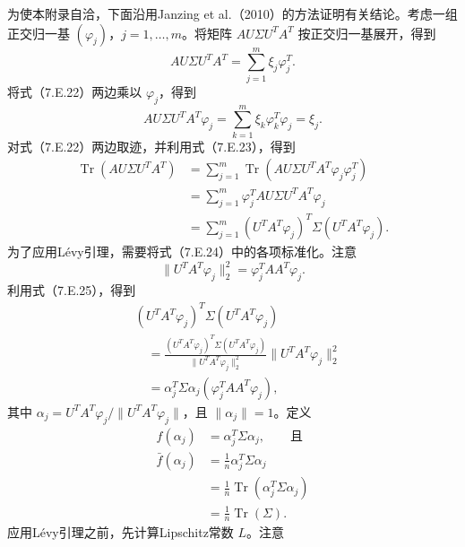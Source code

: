 为使本附录自洽，下面沿用Janzing et al.（2010）的方法证明有关结论。考虑一组正交归一基 $(\varphi_j)$，$j=1,\ldots,m$。将矩阵 $AU\Sigma U^TA^T$ 按正交归一基展开，得到
\begin{equation}
AU\Sigma U^TA^T=\sum_{j=1}^m\xi_j\varphi_j^T.\tag{7.E.22}
\end{equation}
将式（7.E.22）两边乘以 $\varphi_j$，得到
\begin{equation}
AU\Sigma U^TA^T\varphi_j=\sum_{k=1}^m\xi_k\varphi_k^T\varphi_j=\xi_j.\tag{7.E.23}
\end{equation}
对式（7.E.22）两边取迹，并利用式（7.E.23），得到
\begin{equation}
\begin{aligned}
\operatorname{Tr}(AU\Sigma U^TA^T)
 &=\sum_{j=1}^m\operatorname{Tr}(AU\Sigma U^TA^T\varphi_j\varphi_j^T)\\
 &=\sum_{j=1}^m\varphi_j^TAU\Sigma U^TA^T\varphi_j\\
 &=\sum_{j=1}^m(U^TA^T\varphi_j)^T\Sigma(U^TA^T\varphi_j).
\end{aligned}\tag{7.E.24}
\end{equation}
为了应用Lévy引理，需要将式（7.E.24）中的各项标准化。注意
\begin{equation}
\|U^TA^T\varphi_j\|_2^2=\varphi_j^TAA^T\varphi_j.\tag{7.E.25}
\end{equation}
利用式（7.E.25），得到
\begin{equation}
\begin{aligned}
&(U^TA^T\varphi_j)^T\Sigma(U^TA^T\varphi_j)\\
&\quad=\frac{(U^TA^T\varphi_j)^T\Sigma(U^TA^T\varphi_j)}
 {\|U^TA^T\varphi_j\|_2^2}\|U^TA^T\varphi_j\|_2^2\\
&\quad=\alpha_j^T\Sigma\alpha_j(\varphi_j^TAA^T\varphi_j),
\end{aligned}\tag{7.E.26}
\end{equation}
其中 $\alpha_j=U^TA^T\varphi_j/\|U^TA^T\varphi_j\|$，且 $\|\alpha_j\|=1$。定义
\begin{equation}
\begin{aligned}
f(\alpha_j)&=\alpha_j^T\Sigma\alpha_j,\qquad\text{且}\\
\bar f(\alpha_j)&=\frac1n\alpha_j^T\Sigma\alpha_j\\
 &=\frac1n\operatorname{Tr}(\alpha_j^T\Sigma\alpha_j)\\
 &=\frac1n\operatorname{Tr}(\Sigma).
\end{aligned}\tag{7.E.27}
\end{equation}
应用Lévy引理之前，先计算Lipschitz常数 $L$。注意
